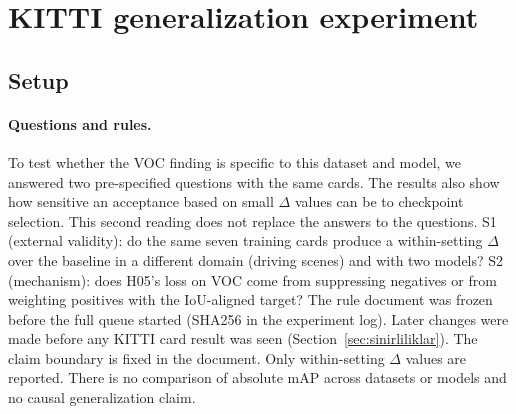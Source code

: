 \documentclass[pdflatex,iicol,sn-mathphys-num]{sn-jnl}
\begin{document}
\section{KITTI generalization experiment}\label{sec:genelleme}

\subsection{Setup}\label{sec:genelleme-protokol}

\paragraph{Questions and rules.}
To test whether the VOC finding is specific to this dataset and model, we answered two pre-specified questions with the same cards. The results also show how sensitive an acceptance based on small $\Delta$ values can be to checkpoint selection. This second reading does not replace the answers to the questions. S1 (external validity): do the same seven training cards produce a within-setting $\Delta$ over the baseline in a different domain (driving scenes) and with two models? S2 (mechanism): does H05's loss on VOC come from suppressing negatives or from weighting positives with the IoU-aligned target? The rule document was frozen before the full queue started (SHA256 in the experiment log). Later changes were made before any KITTI card result was seen (Section~\ref{sec:sinirliliklar}). The claim boundary is fixed in the document. Only within-setting $\Delta$ values are reported. There is no comparison of absolute mAP across datasets or models and no causal generalization claim.
\end{document}
